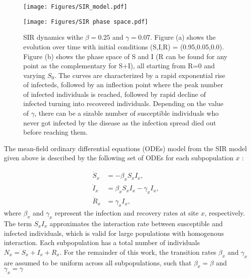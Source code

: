 \begin{figure}[ht]
    \centering
    \begin{minipage}{0.45\textwidth}
        \centering
        \texttt{[image: Figures/SIR\_model.pdf]}
        \subcaption{}
    \end{minipage}
    \begin{minipage}{0.45\textwidth}
        \centering
        \texttt{[image: Figures/SIR phase space.pdf]}
        \subcaption{}
    \end{minipage}
    \hfill
    \caption{\small SIR dynamics withe $\beta=0.25$ and $\gamma=0.07$. Figure (a) shows the evolution over time with initial conditions (S,I,R) = (0.95,0.05,0.0). Figure (b) shows the phase space of S and I (R can be found for any point as the complementary for S+I), all starting from R=0 and varying $S_0$. The curves are characterized by a rapid exponential rise of infecteds, followed by an inflection point where the peak number of infected individuals is reached, followed by rapid decline of infected turning into recovered individuals. Depending on the value of $\gamma$, there can be a sizable number of susceptible individuals who never got infected by the disease as the infection spread died out before reaching them.}
    \label{fig:SIR Dynamics}
\end{figure}
The mean-field ordinary differential equations (ODEs) model from the SIR model given above is described by the following set of ODEs for each subpopulation $x$ :%

\begin{equation}
\begin{aligned}
    \dot{S}_{x} &= -\beta_{x} S_{x} I_{x}, \\
    \dot{I}_{x} &= \beta_{x} S_{x} I_{x} - \gamma_{x} I_{x}, \\
    \dot{R}_{x} &= \gamma_{x} I_{x},
\end{aligned}
\end{equation}
where $ \beta_x$ and $ \gamma_x$ represent the infection and recovery rates at site $x$, respectively.\\
The term $S_x I_x$ approximates the interaction rate between susceptible and infected individuals, which is valid for large populations with homogenous interaction.%
Each subpopulation has a total number of individuals $ N_x = S_x + I_x + R_x$.
For the remainder of this work, the transition rates $\beta_x$ and $ \gamma_x$ are assumed to be uniform across all subpopulations, such that $\beta_x=\beta$ and $ \gamma_x=\gamma$ \\


